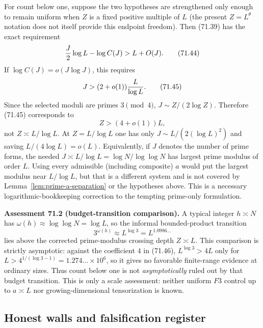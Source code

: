 \documentclass[10pt,reqno]{amsart}
\theoremstyle{definition}
\newcommand{\1}{\mathbf 1}
\begin{document}
For count below one, suppose the two hypotheses are strengthened only enough
to remain uniform when $Z$ is a fixed positive multiple of $L$ (the present
$Z=L^\theta$ notation does not itself provide this endpoint freedom).
Then (71.39) has the exact requirement
\begin{equation}
                 {J\over2}\log L-\log C(J)>L+O(J).        \tag{71.44}
\end{equation}
If $\log C(J)=o(J\log J)$, this requires
\begin{equation}
        J>(2+o(1)){L\over\log L}.                         \tag{71.45}
\end{equation}
Since the selected moduli are primes $3\pmod4$,
$J\sim Z/(2\log Z)$.  Therefore (71.45) corresponds to
\begin{equation}
                         Z>(4+o(1))L,                     \tag{71.46}
\end{equation}
not $Z\asymp L/\log L$.  At $Z=L/\log L$ one has only
$J\sim L/(2(\log L)^2)$ and saving $L/(4\log L)=o(L)$.
Equivalently, if $J$ denotes the number of prime forms, the needed
$J\asymp L/\log L=\log N/\log\log N$ has largest prime modulus of order
$L$.  Using every admissible (including composite) $a$ would put the
largest modulus near $L/\log L$, but that is a different system and is
not covered by Lemma~\ref{lem:prime-a-separation} or the hypotheses above.  This is a necessary
logarithmic-bookkeeping correction to the tempting prime-only formulation.

\medskip\noindent\textbf{Assessment 71.2 (budget-transition comparison).}  A typical integer
$h\asymp N$ has $\omega(h)\approx\log\log N=\log L$, so the informal
bounded-product transition
\begin{equation}
                  3^{\omega(h)}\approx L^{\log3}
                     =L^{1.0986\ldots}                   \tag{71.47}
\end{equation}
lies above the corrected prime-modulus crossing depth $Z\asymp L$.
This comparison is strictly asymptotic: against the coefficient $4$ in
(71.46), $L^{\log3}>4L$ only for
$L>4^{1/(\log3-1)}=1.274\ldots\times10^6$, so it gives no favorable
finite-range evidence at ordinary sizes.  Thus count below one is not
\emph{asymptotically} ruled out by that budget transition.  This is only a scale
assessment: neither uniform $F3$ control up to $a\asymp L$ nor
growing-dimensional tensorization is known.

\subsection{Honest walls and falsification register}
\end{document}
